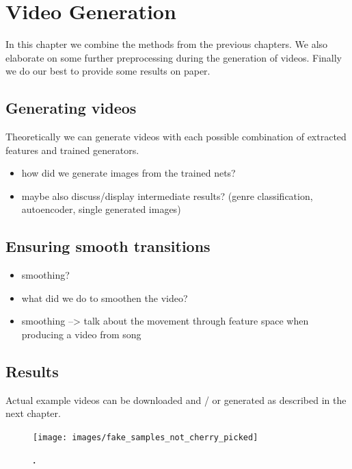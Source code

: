 \chapter{Video Generation}\label{ch:results}

    In this chapter we combine the methods from the previous chapters. We also elaborate on some further preprocessing during the generation of videos. Finally we do our best to provide some results on paper.

    \section{Generating videos}
        
        Theoretically we can generate videos with each possible combination of extracted features and trained generators.

        \begin{itemize}
            \item how did we generate images from the trained nets?
            \item maybe also discuss/display intermediate results? (genre classification, autoencoder, single generated images)
        \end{itemize}

    \section{Ensuring smooth transitions}
        
        \begin{itemize}
            \item smoothing?
            \item what did we do to smoothen the video?
            \item smoothing --> talk about the movement through feature space when producing a video from song
        \end{itemize}

    \section{Results}

        Actual example videos can be downloaded and / or generated as described in the next chapter.

        \begin{figure}[ht]
            \centering
            \texttt{[image: images/fake\_samples\_not\_cherry\_picked]}
            \caption[not used]
            {
                \textbf{.}
            }
            \label{fig:dcgan_samples}
        \end{figure}

